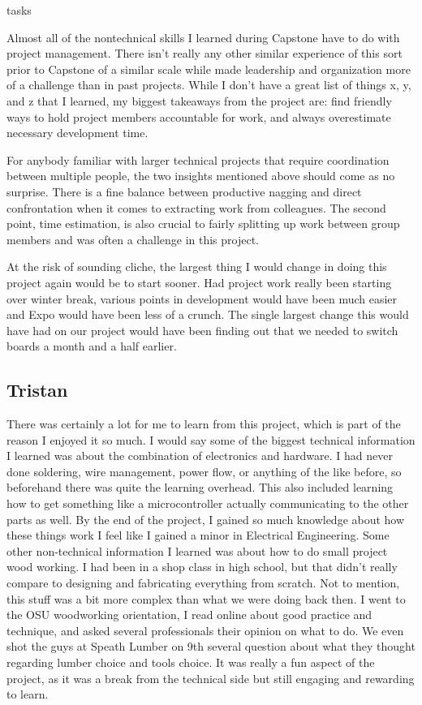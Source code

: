 tasks\documentclass[onecolumn, draftclsnofoot,10pt, compsoc]{IEEEtran}
\begin{document}
Almost all of the nontechnical skills I learned during Capstone have to do with project management. There isn’t really any other similar experience of this sort prior to Capstone of a similar scale while made leadership and organization more of a challenge than in past projects.
While I don’t have a great list of things x, y, and z that I learned, my biggest takeaways from the project are: find friendly ways to hold project members accountable for work, and always overestimate necessary development time.

For anybody familiar with larger technical projects that require coordination between multiple people, the two insights mentioned above should come as no surprise.
There is a fine balance between productive nagging and direct confrontation when it comes to extracting work from colleagues.
The second point, time estimation, is also crucial to fairly splitting up work between group members and was often a challenge in this project.

At the risk of sounding cliche, the largest thing I would change in doing this project again would be to start sooner.
Had project work really been starting over winter break, various points in development would have been much easier and Expo would have been less of a crunch.
The single largest change this would have had on our project would have been finding out that we needed to switch boards a month and a half earlier.


\subsection{Tristan}
There was certainly a lot for me to learn from this project, which is part of the reason I enjoyed it so much.
I would say some of the biggest technical information I learned was about the combination of electronics and hardware.
I had never done soldering, wire management, power flow, or anything of the like before, so beforehand there was quite the learning overhead.
This also included learning how to get something like a microcontroller actually communicating to the other parts as well.
By the end of the project, I gained so much knowledge about how these things work I feel like I gained a minor in Electrical Engineering.
Some other non-technical information I learned was about how to do small project wood working.
I had been in a shop class in high school, but that didn't really compare to designing and fabricating everything from scratch.
Not to mention, this stuff was a bit more complex than what we were doing back then.
I went to the OSU woodworking orientation, I read online about good practice and technique, and asked several professionals their opinion on what to do.
We even shot the guys at Speath Lumber on 9th several question about what they thought regarding lumber choice and tools choice.
It was really a fun aspect of the project, as it was a break from the technical side but still engaging and rewarding to learn.
\end{document}
